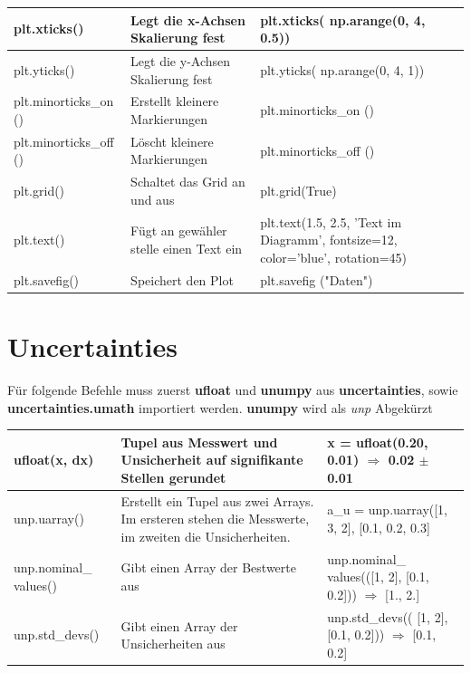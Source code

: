 \documentclass[a4paper,12pt]{article}
\begin{document}
\begin{center}
\begin{tabular}{|p{3cm}|p{8cm}|p{3cm}|}
\hline
plt.xticks() & Legt die x-Achsen Skalierung fest & plt.xticks( np.arange(0, 4, 0.5)) \\
\hline
plt.yticks() & Legt die y-Achsen Skalierung fest & plt.yticks( np.arange(0, 4, 1)) \\
\hline
plt.minorticks\_on () & Erstellt kleinere Markierungen & plt.minorticks\_on () \\
\hline
plt.minorticks\_off () & Löscht kleinere Markierungen & plt.minorticks\_off () \\
\hline
plt.grid() & Schaltet das Grid an und aus & plt.grid(True) \\
\hline
plt.text() & Fügt an gewähler stelle einen Text ein & plt.text(1.5, 2.5, 'Text im Diagramm', fontsize=12, color='blue', rotation=45) \\
\hline
plt.savefig() & Speichert den Plot & plt.savefig ("Daten")\\
\hline
\end{tabular}
\end{center}



\section*{Uncertainties}

Für folgende Befehle muss zuerst \textbf{ufloat} und \textbf{unumpy} aus \textbf{uncertainties}, sowie \textbf{uncertainties.umath} importiert werden. \textbf{unumpy} wird als \textit{unp} Abgekürzt

\begin{center}
\begin{tabular}{|p{3cm}|p{8cm}|p{3cm}|}
\hline
ufloat(x, dx) & Tupel aus Messwert und Unsicherheit auf signifikante Stellen gerundet & x = ufloat(0.20, 0.01) $\Rightarrow$ 0.02 $\pm$ 0.01 \\
\hline
unp.uarray() & Erstellt ein Tupel aus zwei Arrays. Im ersteren stehen die Messwerte, im zweiten die Unsicherheiten. & a\_u = unp.uarray([1, 3, 2], [0.1, 0.2, 0.3] \\
\hline
unp.nominal\_ values() & Gibt einen Array der Bestwerte aus & unp.nominal\_ values(([1, 2], [0.1, 0.2])) \newline{} $\Rightarrow$ [1., 2.] \\
\hline
unp.std\_devs() & Gibt einen Array der Unsicherheiten aus & unp.std\_devs(( [1, 2], [0.1, 0.2])) \newline{} $\Rightarrow$ [0.1, 0.2] \\
\hline
\end{tabular}
\end{center}
\end{document}
